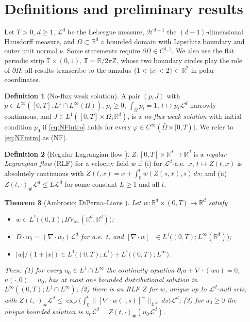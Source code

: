 \documentclass[11pt]{amsart}
\newtheorem{theorem}{Theorem}[section]
\theoremstyle{definition}
\newtheorem{definition}[theorem]{Definition}
\newcommand{\Ld}{\mathcal{L}^d}
\newcommand{\Hd}{\mathcal{H}^{d-1}}
\newcommand{\dive}{\nabla\!\cdot}
\newcommand{\R}{\mathbb{R}}
\newcommand{\T}{\mathbb{T}}
\newcommand{\dd}{\,d}
\begin{document}
\section{Definitions and preliminary results}\label{sec:prelim}

Let $T>0$, $d\ge1$, $\Ld$ be the Lebesgue measure, $\Hd$ the
$(d-1)$-dimensional Hausdorff measure, and $\Omega\subset\R^d$  a
bounded domain with Lipschitz boundary and outer unit normal $\nu$.
Some statements require $\partial\Omega\in C^{1,1}$. We
also use the flat periodic strip $\T\times(0,1)$,
$\T=\R/2\pi\mathbb{Z}$, whose two boundary circles play the role of
$\partial\Omega$; all results transcribe to the annulus
$\{1<|x|<2\}\subset\R^2$ in polar coordinates.

\begin{definition}[No-flux weak solution]\label{def:nfweak}
A pair $(p,J)$ with $p\in L^\infty([0,T];L^1\cap L^\infty(\Omega))$,
$p_t\ge0$, $\int_\Omega p_t=1$, $t\mapsto p_t\Ld$ narrowly
continuous, and $J\in L^1([0,T]\times\Omega;\R^d)$, is a
\emph{no-flux weak solution} with initial condition $p_0$ if
\eqref{eq:NFintro} holds for every
$\varphi\in C^\infty(\bar\Omega\times[0,T))$. We refer to
\eqref{eq:NFintro} as (NF).
\end{definition}

\begin{definition}[Regular Lagrangian flow \cite{DiPernaLions}]
\label{def:rlf}
$Z:[0,T]\times\R^d\to\R^d$ is a \emph{regular Lagrangian flow} (RLF)
for a velocity field $w$ if (i) for $\Ld$-a.e.\ $x$, $t\mapsto
Z(t,x)$ is absolutely continuous with $Z(t,x)=x+\int_0^t
w(Z(s,x),s)\dd s$; and (ii) $Z(t,\cdot)_\#\Ld\le L\Ld$ for some
constant $L\ge1$ and all $t$.
\end{definition}

\begin{theorem}[Ambrosio; DiPerna--Lions
{\cite{Ambrosio04,Ambrosio08,DiPernaLions}}]\label{thm:ambrosio}
Let $w:\R^d\times(0,T)\to\R^d$ satisfy
\begin{itemize}
\item[(R1)] $w\in L^1\big((0,T);BV_{\mathrm{loc}}(\R^d;\R^d)\big)$;
\item[(R2)] $D\!\cdot w_t=(\dive w_t)\Ld$ for a.e.\ $t$, and
$[\dive w]^-\in L^1\big((0,T);L^\infty(\R^d)\big)$;
\item[(R3)] $|w|/(1+|x|)\in L^1\big((0,T);L^1\big)+
L^1\big((0,T);L^\infty\big)$.
\end{itemize}
Then: (1) for every $u_0\in L^1\cap L^\infty$ the continuity equation
$\partial_tu+\dive(wu)=0$, $u(\cdot,0)=u_0$, has at most one bounded
distributional solution in $L^\infty((0,T);L^1\cap L^\infty)$; (2)
there is an RLF $Z$ for $w$, unique up to $\Ld$-null sets, with
$Z(t,\cdot)_\#\Ld\le\exp\big(\int_0^t\|[\dive
w(\cdot,s)]^-\|_{L^\infty}\dd s\big)\Ld$; (3) for $u_0\ge0$ the
unique bounded solution is $u_t\Ld=Z(t,\cdot)_\#(u_0\Ld)$.
\end{theorem}
\end{document}
